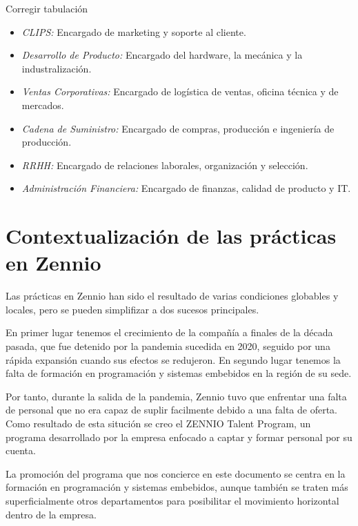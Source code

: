 \alert{Corregir tabulación}

\begin{itemize}
    \item \emph{CLIPS:} Encargado de marketing y soporte al cliente.
    \item \emph{Desarrollo de Producto:} Encargado del hardware, la mecánica y la industralización.
    \item \emph{Ventas Corporativas:} Encargado de logística de ventas, oficina técnica y de mercados.
    \item \emph{Cadena de Suministro:} Encargado de compras, producción e ingeniería de producción.
    \item \emph{RRHH:} Encargado de relaciones laborales, organización y selección.
    \item \emph{Administración Financiera:} Encargado de finanzas, calidad de producto y IT.
\end{itemize}


\section{Contextualización de las prácticas en Zennio}
\label{sec:contextualizacion}

Las prácticas en Zennio han sido el resultado de varias condiciones globables y locales, pero se pueden simplifizar a dos sucesos principales.

En primer lugar tenemos el crecimiento de la compañía a finales de la década pasada, que fue detenido por la pandemia sucedida en 2020, seguido por una rápida expansión cuando sus efectos se redujeron.
En segundo lugar tenemos la falta de formación en programación y sistemas embebidos en la región de su sede.

Por tanto, durante la salida de la pandemia, Zennio tuvo que enfrentar una falta de personal que no era capaz de suplir facilmente debido a una falta de oferta. Como resultado de esta situción se creo el ZENNIO Talent Program, un programa desarrollado por la empresa enfocado a captar y formar personal por su cuenta.

La promoción del programa que nos concierce en este documento se centra en la formación en programación y sistemas embebidos, aunque también se traten más superficialmente otros departamentos para posibilitar el movimiento horizontal dentro de la empresa.

\makeatother